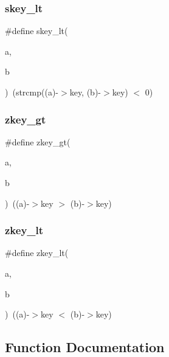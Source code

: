 \mbox{\label{a00140_a5595011b8e4a8f5aca1494b1f5d69e4c}} 
\subsubsection{\texorpdfstring{skey\+\_\+lt}{skey\_lt}}
{\footnotesize\ttfamily \#define skey\+\_\+lt(\begin{DoxyParamCaption}\item[{}]{a,  }\item[{}]{b }\end{DoxyParamCaption})~(strcmp((a)-\/$>$key, (b)-\/$>$key) $<$ 0)}

\mbox{\label{a00140_a0012fecc13d9d851de1b0013074abc5a}} 
\subsubsection{\texorpdfstring{zkey\+\_\+gt}{zkey\_gt}}
{\footnotesize\ttfamily \#define zkey\+\_\+gt(\begin{DoxyParamCaption}\item[{}]{a,  }\item[{}]{b }\end{DoxyParamCaption})~((a)-\/$>$key $>$ (b)-\/$>$key)}

\mbox{\label{a00140_a2c3ab0946b7cf6f4e549f475cd245ad5}} 
\subsubsection{\texorpdfstring{zkey\+\_\+lt}{zkey\_lt}}
{\footnotesize\ttfamily \#define zkey\+\_\+lt(\begin{DoxyParamCaption}\item[{}]{a,  }\item[{}]{b }\end{DoxyParamCaption})~((a)-\/$>$key $<$ (b)-\/$>$key)}



\subsection{Function Documentation}
\mbox{\label{a00140_adb7cdf8f8069ea5d9717b43785fd1a6c}} 
